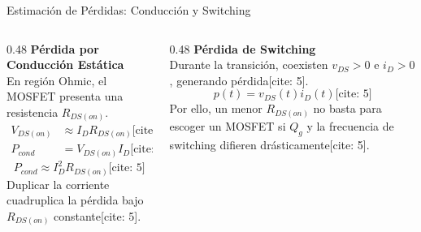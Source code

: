 \documentclass[aspectratio=169, table]{beamer}
\begin{document}
\begin{frame}{Estimación de Pérdidas: Conducción y Switching}
    \begin{columns}[T]
        \begin{column}{0.48\textwidth}
            \textbf{Pérdida por Conducción Estática} \\
            En región Ohmic, el MOSFET presenta una resistencia $R_{DS(on)}$.
            \begin{align*}
                V_{DS(on)} &\approx I_D R_{DS(on)} \text{[cite: 5]} \\
                P_{cond} &= V_{DS(on)} I_D \text{[cite: 5]} 
            \end{align*}
            \vspace{-0.4cm}
            \begin{equation*}
                \boxed{P_{cond} \approx I_D^2 R_{DS(on)}} \text{[cite: 5]}
            \end{equation*}
            Duplicar la corriente cuadruplica la pérdida bajo $R_{DS(on)}$ constante[cite: 5].
        \end{column}
        \begin{column}{0.48\textwidth}
            \textbf{Pérdida de Switching} \\
            Durante la transición, coexisten $v_{DS} > 0$ e $i_D > 0$, generando pérdida[cite: 5].
            \begin{equation*}
                \boxed{p(t) = v_{DS}(t) i_D(t)} \text{[cite: 5]}
            \end{equation*}
            Por ello, un menor $R_{DS(on)}$ no basta para escoger un MOSFET si $Q_g$ y la frecuencia de switching difieren drásticamente[cite: 5].
        \end{column}
    \end{columns}
\end{frame}
\end{document}
